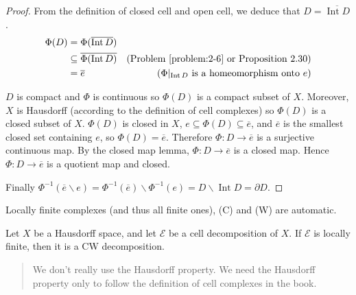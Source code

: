 \begin{proof}
	From the definition of closed cell and open cell, we deduce that $D = \overline{\operatorname{Int} D}$.
	\begin{align*}
		\Phi(D) & = \Phi(\overline{\operatorname{Int} D})                                                                                   \\
		        & \subseteq \overline{\Phi(\operatorname{Int} D)} & \text{(Problem~\ref{problem:2-6} or Proposition 2.30)}                  \\
		        & = \overline{e}                                  & \text{($\Phi\vert_{\operatorname{Int} D}$ is a homeomorphism onto $e$)}
	\end{align*}

	$D$ is compact and $\Phi$ is continuous so $\Phi(D)$ is a compact subset of $X$. Moreover, $X$ is Hausdorff (according to the definition of cell complexes) so $\Phi(D)$ is a closed subset of $X$. $\Phi(D)$ is closed in $X$, $e\subseteq \Phi(D) \subseteq \overline{e}$, and $\overline{e}$ is the smallest closed set containing $e$, so $\Phi(D) = \overline{e}$. Therefore $\Phi: D \to \overline{e}$ is a surjective continuous map. By the closed map lemma, $\Phi: D \to \overline{e}$ is a closed map. Hence $\Phi: D \to \overline{e}$ is a quotient map and closed.

	Finally $\Phi^{-1}(\overline{e}\smallsetminus e) = \Phi^{-1}(\overline{e}) \smallsetminus \Phi^{-1}(e) = D \smallsetminus \operatorname{Int} D = \partial D$.
\end{proof}

Locally finite complexes (and thus all finite ones), (C) and (W) are automatic.

\begin{prop}{5.4}
	Let $X$ be a Hausdorff space, and let $\mathscr{E}$ be a cell decomposition of $X$. If $\mathscr{E}$ is locally finite, then it is a CW decomposition.
\end{prop}

\begin{quotation}
	We don't really use the Hausdorff property. We need the Hausdorff property only to follow the definition of cell complexes in the book.
\end{quotation}

